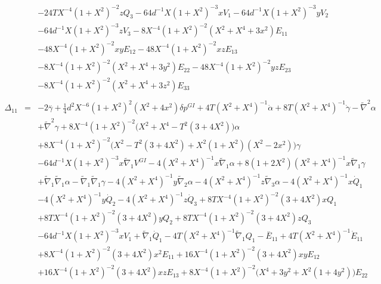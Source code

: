 \documentclass[10pt,letterpaper]{article}
\numberwithin{equation}{section}
\begin{document}
\begin{eqnarray}
&& - 24 T X^{-4} (1 + X^2)^{-2} z Q_{3} - 64 d^{-1} X (1 + X^2)^{-3} x V_{1} - 64 d^{-1} X (1 + X^2)^{-3} y V_{2} \nonumber \\ 
&& - 64 d^{-1} X (1 + X^2)^{-3} z V_{3}-8 X^{-4} (1 + X^2)^{-2} (X^2 + X^4 + 3 x^2) E_{11} \nonumber \\ 
&& - 48 X^{-4} (1 + X^2)^{-2} x y E_{12} - 48 X^{-4} (1 + X^2)^{-2} x z E_{13} \nonumber \\ 
&& - 8 X^{-4} (1 + X^2)^{-2} (X^2 + X^4 + 3 y^2) E_{22} - 48 X^{-4} (1 + X^2)^{-2} y z E_{23} \nonumber \\ 
&& - 8 X^{-4} (1 + X^2)^{-2} (X^2 + X^4 + 3 z^2) E_{33}
\\  \nonumber\\ 
\Delta_{11}&=& -2 \overset{..}{\gamma} + \tfrac{1}{4} d^2 X^{-6} (1 + X^2)^2 (X^2 + 4 x^2) \delta p^{GI}{} + 4 T (X^2 + X^4)^{-1} \dot{\alpha} + 8 T (X^2 + X^4)^{-1} \dot{\gamma} -  \tilde{\nabla}^{2}\alpha \nonumber \\ 
&& + \tilde{\nabla}^{2}\gamma + 8 X^{-4} (1 + X^2)^{-2} \bigl(X^2 + X^4 -  T^2 (3 + 4 X^2)\bigr) \alpha \nonumber \\ 
&& + 8 X^{-4} (1 + X^2)^{-2} \bigl(X^2 -  T^2 (3 + 4 X^2) + X^2 (1 + X^2) (X^2 - 2 x^2)\bigr) \gamma \nonumber \\ 
&& - 64 d^{-1} X (1 + X^2)^{-3} x \tilde{\nabla}_{1}V^{GI}{} - 4 (X^2 + X^4)^{-1} x \tilde{\nabla}_{1}\alpha + 8 (1 + 2 X^2) (X^2 + X^4)^{-1} x \tilde{\nabla}_{1}\gamma \nonumber \\ 
&& + \tilde{\nabla}_{1}\tilde{\nabla}_{1}\alpha -  \tilde{\nabla}_{1}\tilde{\nabla}_{1}\gamma - 4 (X^2 + X^4)^{-1} y \tilde{\nabla}_{2}\alpha - 4 (X^2 + X^4)^{-1} z \tilde{\nabla}_{3}\alpha -4 (X^2 + X^4)^{-1} x \dot{Q}_{1} \nonumber \\ 
&& - 4 (X^2 + X^4)^{-1} y \dot{Q}_{2} - 4 (X^2 + X^4)^{-1} z \dot{Q}_{3} + 8 T X^{-4} (1 + X^2)^{-2} (3 + 4 X^2) x Q_{1} \nonumber \\ 
&& + 8 T X^{-4} (1 + X^2)^{-2} (3 + 4 X^2) y Q_{2} + 8 T X^{-4} (1 + X^2)^{-2} (3 + 4 X^2) z Q_{3} \nonumber \\ 
&& - 64 d^{-1} X (1 + X^2)^{-3} x V_{1} + \tilde{\nabla}_{1}\dot{Q}_{1} - 4 T (X^2 + X^4)^{-1} \tilde{\nabla}_{1}Q_{1}- \overset{..}{E}_{11} + 4 T (X^2 + X^4)^{-1} \dot{E}_{11} \nonumber \\ 
&& + 8 X^{-4} (1 + X^2)^{-2} (3 + 4 X^2) x^2 E_{11} + 16 X^{-4} (1 + X^2)^{-2} (3 + 4 X^2) x y E_{12} \nonumber \\ 
&& + 16 X^{-4} (1 + X^2)^{-2} (3 + 4 X^2) x z E_{13} + 8 X^{-4} (1 + X^2)^{-2} \bigl(X^4 + 3 y^2 + X^2 (1 + 4 y^2)\bigr) E_{22} \nonumber \\ 

\end{eqnarray}
\end{document}
